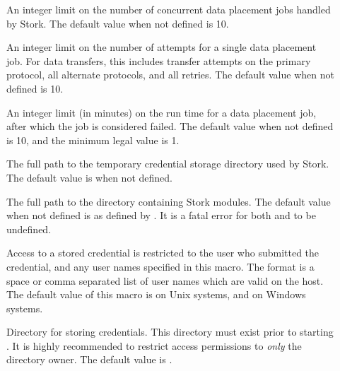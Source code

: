 \begin{description}

\item[]
\label{param:StorkMaxNumJobs}
An integer limit on the number of concurrent data placement jobs
handled by Stork.  The default value when not defined is 10.

\item[]
\label{param:StorkMaxRetry}
An integer limit on the
number of attempts for a single data placement job.  For data transfers,
this includes transfer attempts on the primary protocol, all
alternate protocols, and all retries.
The default value when not defined is 10.

\item[]
\label{param:StorkMaxDelayInMinutes}
An integer limit (in minutes) on the run time for a data placement job,
after which the job is considered failed.
The default value when not defined is 10,
and the minimum legal value is 1.

\item[]
\label{param:StorkTmpCredDir}
The full path to the temporary credential storage directory used by Stork.
The default value is  when not defined. 

\item[]
\label{param:StorkModuleDir}
The full path to the directory containing Stork modules.
The default value when not defined is 
as defined by .  It is a fatal error for
both  and  to be undefined.

\item[]
\label{param:CreddSuperUsers}   Access to a stored credential is
restricted to the user who submitted the credential, and any user
names specified in this macro.  The format is a space or comma
separated list of user names which are valid on the 
host.
The default value of this macro is  on Unix systems, and
 on Windows systems.

\item[]
\label{param:CredStoreDir}   Directory for storing credentials.  This
directory must exist prior to starting .  It is highly
recommended to restrict access permissions to \emph{only} the
directory owner.
The default value is
.


\end{description}
